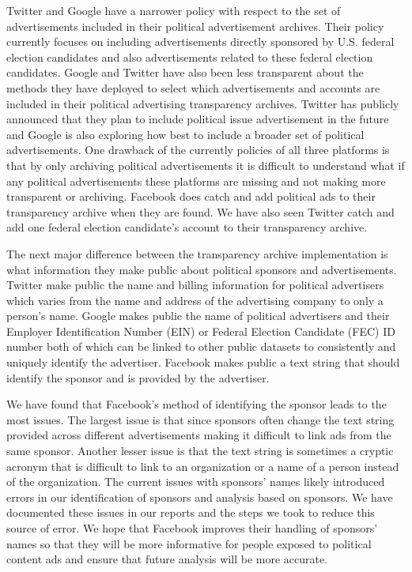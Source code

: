 \documentclass[fleqn,10pt]{wlscirep}
\begin{document}
Twitter and Google have a narrower policy with respect to the set of advertisements included in their political advertisement archives. Their policy currently focuses on including advertisements directly sponsored by U.S. federal election candidates and also advertisements related to these federal election candidates. Google and Twitter have also been less transparent about the methods they have deployed to select which advertisements and accounts are included in their political advertising transparency archives. Twitter has publicly announced that they plan to include political issue advertisement in the future and Google is also exploring how best to include a broader set of political advertisements. One drawback of the currently policies of all three platforms is that by only archiving political advertisements it is difficult to understand what if any political advertisements these platforms are missing and not making more transparent or archiving. Facebook does catch and add political ads to their transparency archive when they are found. We have also seen Twitter catch and add one federal election candidate's account to their transparency archive.

The next major difference between the transparency archive implementation is what information they make public about political sponsors and advertisements. Twitter make public the name and billing information for political advertisers which varies from the name and address of the advertising company to only a person's name. Google makes public the name of political advertisers and their Employer Identification Number (EIN) or Federal Election Candidate (FEC) ID number both of which can be linked to other public datasets to consistently and uniquely identify the advertiser. Facebook makes public a text string that should identify the sponsor and is provided by the advertiser. 

We have found that Facebook's method of identifying the sponsor leads to the most issues. The largest issue is that since sponsors often change the text string provided across different advertisements making it difficult to link ads from the same sponsor. Another lesser issue is that the text string is sometimes a cryptic acronym that is difficult to link to an organization or a name of a person instead of the organization. The current issues with sponsors' names likely introduced errors in our identification of sponsors and analysis based on sponsors. We have documented these issues in our reports and the steps we took to reduce this source of error. We hope that Facebook improves their handling of sponsors' names so that they will be more informative for people exposed to political content ads and ensure that future analysis will be more accurate.
\end{document}
